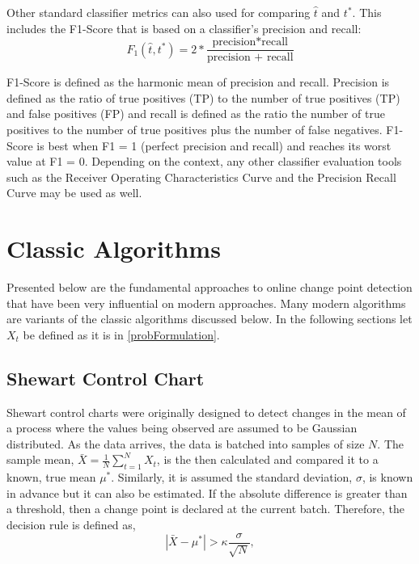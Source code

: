 
Other standard classifier metrics can also used for comparing $\hat{t}$ and $t^*$. This includes the  F1-Score that is based on a classifier's precision and recall:
\begin{equation}
F_1(\hat{t}, t^*) = 2 * \frac{\text{precision*recall}}{\text{precision + recall}}
\end{equation}

 F1-Score is defined as the harmonic mean of precision and recall. Precision is defined as the ratio of true positives (TP) to the
number of true positives (TP) and false positives (FP) and recall is defined as the ratio the number of true positives to the
number of true positives plus the number of false negatives. F1-Score is best when F1 = 1 (perfect precision and recall) and reaches its worst value at F1 = 0. Depending on the context, any other classifier evaluation tools such as the Receiver Operating Characteristics Curve and the Precision Recall Curve may be used as well.

\section{Classic Algorithms}
Presented below are the fundamental approaches to online change point detection that have been very influential on modern approaches. Many modern algorithms are variants of the classic algorithms discussed below. In the following sections let $X_t$ be defined as it is in \ref{probFormulation}.

\subsection{Shewart Control Chart}
Shewart control charts were originally designed to detect changes in the mean of a process where the values being observed are assumed to be Gaussian distributed. As the data arrives, the data is batched into samples of size $N$. The sample mean, $\bar{X}=\frac{1}{N} \sum_{t=1}^N X_t$, is the then calculated and compared it to a known, true mean $\mu^*$.  Similarly, it is assumed the standard deviation, $\sigma$, is known in advance but it can also be estimated. If the absolute difference is greater than a threshold, then a change point is declared at the current batch. Therefore, the decision rule is defined as,
\begin{equation}
|\bar{X}-\mu^*| > \kappa \frac{\sigma}{\sqrt{N}},
\end{equation}

